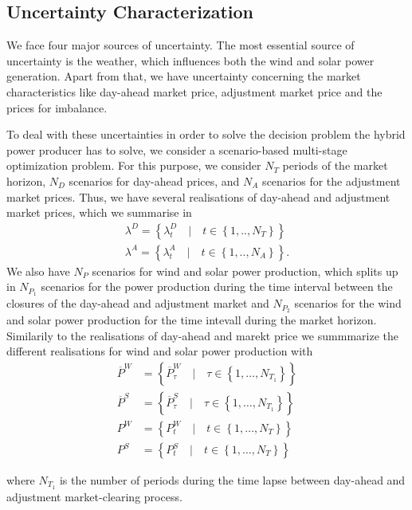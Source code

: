 \subsection{Uncertainty Characterization}

We face four major sources of uncertainty. The most essential source of uncertainty is the weather, which influences both the wind and solar power generation. Apart from that, we have uncertainty concerning the market characteristics like day-ahead market price, adjustment market price and the prices for imbalance.

To deal with these uncertainties in order to solve the decision problem the hybrid power producer has to solve, we consider a scenario-based multi-stage optimization problem. 
For this purpose, we consider $N_{T}$ periods of the market horizon, $N_{D}$ scenarios for day-ahead prices, and $N_{A}$ scenarios for the adjustment market prices. Thus, we have several realisations of day-ahead and adjustment market prices, which we summarise in
\begin{align*}
	\lambda^{D}=\left\{\lambda_{t}^{D} \quad \lvert \quad t \in \left\{1, .., N_{T}\right\}\right\}
	\\ \lambda^{A}=\left\{\lambda_{t}^{A}\quad \lvert \quad t \in \left\{1, .., N_{A}\right\}\right\}.
\end{align*}
We also have $N_P$ scenarios for wind and solar power production, which splits up in $N_{P_1}$ scenarios for the power production during the time interval between the closures of the day-ahead and adjustment market and $N_{P_2}$ scenarios for the wind and solar power production for the time intevall during the market horizon. Similarily to the realisations of day-ahead and marekt price we summmarize the different realisations for wind and solar power production with 
\begin{align*}
\overline{P}^{W} &=\left\{\overline{P}_{\tau}^{W} \quad \lvert \quad \tau \in \left\{1, \dots, N_{T_1}\right\}\right\} \\
\overline{P}^S &=\left\{\overline{P}_{\tau}^{S} \quad \lvert \quad \tau \in \left\{1, \dots, N_{T_1}\right\}\right\} \\
P^W &= \left\{P_{t}^{W} \quad \lvert \quad t \in \left\{1, \dots, N_T\right\}\right\} \\
P^S &= \left\{P_{t}^{S} \quad \lvert \quad t \in \left\{1, \dots, N_T\right\}\right\} 
\end{align*}

where $N_{T_1} $ is the number of periods during the time lapse between day-ahead and adjustment market-clearing process.


